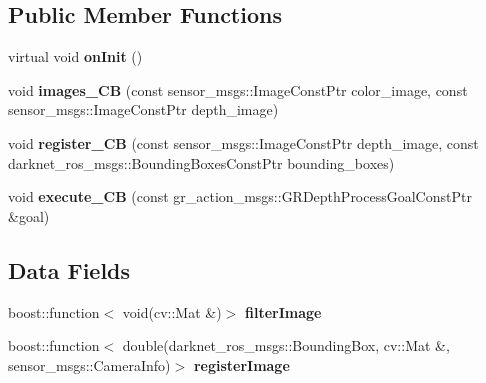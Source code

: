 \subsection*{Public Member Functions}
\begin{DoxyCompactItemize}
\item 
\mbox{\label{classgr__depth__processing_1_1MyNodeletClass_a95b4c054be9c6aa2ac8ab82fa3c21b02}} 
virtual void {\bfseries on\+Init} ()
\item 
\mbox{\label{classgr__depth__processing_1_1MyNodeletClass_a8e66b79b9eb03f382cf808df0f4d8e69}} 
void {\bfseries images\+\_\+\+CB} (const sensor\+\_\+msgs\+::\+Image\+Const\+Ptr color\+\_\+image, const sensor\+\_\+msgs\+::\+Image\+Const\+Ptr depth\+\_\+image)
\item 
\mbox{\label{classgr__depth__processing_1_1MyNodeletClass_a064aea8e677cd7ccbfa91cb0fda60424}} 
void {\bfseries register\+\_\+\+CB} (const sensor\+\_\+msgs\+::\+Image\+Const\+Ptr depth\+\_\+image, const darknet\+\_\+ros\+\_\+msgs\+::\+Bounding\+Boxes\+Const\+Ptr bounding\+\_\+boxes)
\item 
\mbox{\label{classgr__depth__processing_1_1MyNodeletClass_a0dc37fa50056e20e999ac98e25b8e3aa}} 
void {\bfseries execute\+\_\+\+CB} (const gr\+\_\+action\+\_\+msgs\+::\+G\+R\+Depth\+Process\+Goal\+Const\+Ptr \&goal)
\end{DoxyCompactItemize}
\subsection*{Data Fields}
\begin{DoxyCompactItemize}
\item 
\mbox{\label{classgr__depth__processing_1_1MyNodeletClass_af9adbba9c3b0b56f918af23a3b2c30c2}} 
boost\+::function$<$ void(cv\+::\+Mat \&)$>$ {\bfseries filter\+Image}
\item 
\mbox{\label{classgr__depth__processing_1_1MyNodeletClass_a5af97f6534cc2e83a2f9f36f8a97a1a7}} 
boost\+::function$<$ double(darknet\+\_\+ros\+\_\+msgs\+::\+Bounding\+Box, cv\+::\+Mat \&, sensor\+\_\+msgs\+::\+Camera\+Info)$>$ {\bfseries register\+Image}
\end{DoxyCompactItemize}
